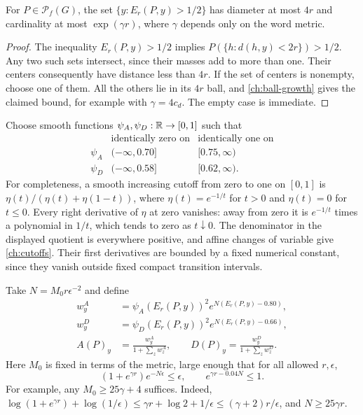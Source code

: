 \begin{lemma}
\label{ch:center-geometry}
For $P\in\mathcal P_f(G)$, the set
$\{y:E_r(P,y)>1/2\}$ has diameter at most $4r$ and cardinality at most
$\exp(\gamma r)$, where $\gamma$ depends only on the word metric.
\end{lemma}

\begin{proof}
The inequality $E_r(P,y)>1/2$ implies
$P(\{h:d(h,y)<2r\})>1/2$.  Any two such sets intersect, since their
masses add to more than one.  Their centers consequently have distance less
than $4r$.  If the set of centers is nonempty, choose one of them.  All the
others lie in its $4r$ ball, and \eqref{ch:ball-growth} gives the claimed
bound, for example with $\gamma=4c_d$.  The empty case is immediate.
\end{proof}

Choose smooth functions $\psi_A,\psi_D:\mathbb R\to[0,1]$ such that
\begin{equation}
 \begin{array}{c|cc}
       &\text{identically zero on}&\text{identically one on}\\ \hline
 \psi_A&(-\infty,0.70]&[0.75,\infty)\\
 \psi_D&(-\infty,0.58]&[0.62,\infty).
 \end{array}
 \label{ch:cutoffs}
\end{equation}
For completeness, a smooth increasing cutoff from zero to one on $[0,1]$
is $\eta(t)/(\eta(t)+\eta(1-t))$, where
$\eta(t)=e^{-1/t}$ for $t>0$ and $\eta(t)=0$ for $t\le0$.
Every right derivative of $\eta$ at zero vanishes: away from zero it is
$e^{-1/t}$ times a polynomial in $1/t$, which tends to zero as $t\downarrow0$.
The denominator in the displayed quotient is everywhere positive, and
affine changes of variable give \eqref{ch:cutoffs}.  Their first derivatives
are bounded by a fixed numerical constant, since they vanish outside fixed
compact transition intervals.

Take $N=M_0r\epsilon^{-2}$ and define
\begin{equation}
 \begin{split}
 w^A_y&=\psi_A(E_r(P,y))^2
              e^{N(E_r(P,y)-0.80)},\\
 w^D_y&=\psi_D(E_r(P,y))^2
              e^{N(E_r(P,y)-0.66)},\\
 A(P)_y&=\frac{w^A_y}{1+\sum_z w^A_z},\qquad
 D(P)_y=\frac{w^D_y}{1+\sum_z w^D_z}.
 \end{split}
 \label{ch:selector-formulas}
\end{equation}
Here $M_0$ is fixed in terms of the metric, large enough that for all allowed
$r,\epsilon$,
\begin{equation}
 (1+e^{\gamma r})e^{-N\epsilon}\le\epsilon,
 \qquad e^{\gamma r-0.04N}\le1.
 \label{ch:exponential-choices}
\end{equation}
For example, any $M_0\ge25\gamma+4$ suffices.  Indeed,
$\log(1+e^{\gamma r})+\log(1/\epsilon)
\le\gamma r+\log2+1/\epsilon\le(\gamma+2)r/\epsilon$,
and $N\ge25\gamma r$.

